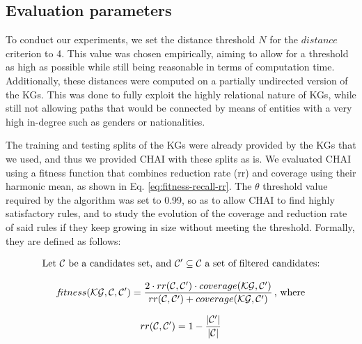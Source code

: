 \subsection{Evaluation parameters}\label{sec:impl-details}
To conduct our experiments, we set the distance threshold $N$ for the $distance$ criterion to 4. This value was chosen empirically, aiming to allow for a threshold as high as possible while still being reasonable in terms of computation time. Additionally, these distances were computed on a partially undirected version of the KGs. This was done to fully exploit the highly relational nature of KGs, while still not allowing paths that would be connected by means of entities with a very high in-degree such as genders or nationalities.

The training and testing splits of the KGs were already provided by the KGs that we used, and thus we provided CHAI with these splits as is. We evaluated CHAI using a fitness function that combines reduction rate (rr) and coverage using their harmonic mean, as shown in Eq. \ref{eq:fitness-recall-rr}. The $\theta$ threshold value required by the algorithm was set to 0.99, so as to allow CHAI to find highly satisfactory rules, and to study the evolution of the coverage and reduction rate of said rules if they keep growing in size without meeting the threshold. Formally, they are defined as follows:

\begin{equation*}
\centering
\begin{aligned}
\textrm{Let}~\Sset~\textrm{be a candidates set, and}~\Sset'\subseteq \Sset~\textrm{a set of filtered candidates:}
\end{aligned}
\end{equation*}

\begin{equation}
\label{eq:fitness-recall-rr}
\begin{gathered}
{\mkern-2mu f\mkern-3mu}itness(\textmd{\textup{\ensuremath{\mathcal{K}}\ensuremath{\mathcal{G}}}}, \mathcal{C}, \mathcal{C}') = \frac{2 \cdot rr(\mathcal{C}, \mathcal{C}') \cdot coverage(\textmd{\textup{\ensuremath{\mathcal{K}}\ensuremath{\mathcal{G}}}}, \mathcal{C}')}{rr(\mathcal{C}, \mathcal{C}') + coverage(\textmd{\textup{\ensuremath{\mathcal{K}}\ensuremath{\mathcal{G}}}}, \mathcal{C}')}\textrm{\,,~where}
\end{gathered}
\end{equation}

\begin{equation*}
\label{eq:rr}
\begin{gathered}
rr(\mathcal{C}, \mathcal{C}') = 1 - \frac{|\mathcal{C}'|}{|\mathcal{C}|}
\end{gathered}
\end{equation*}

